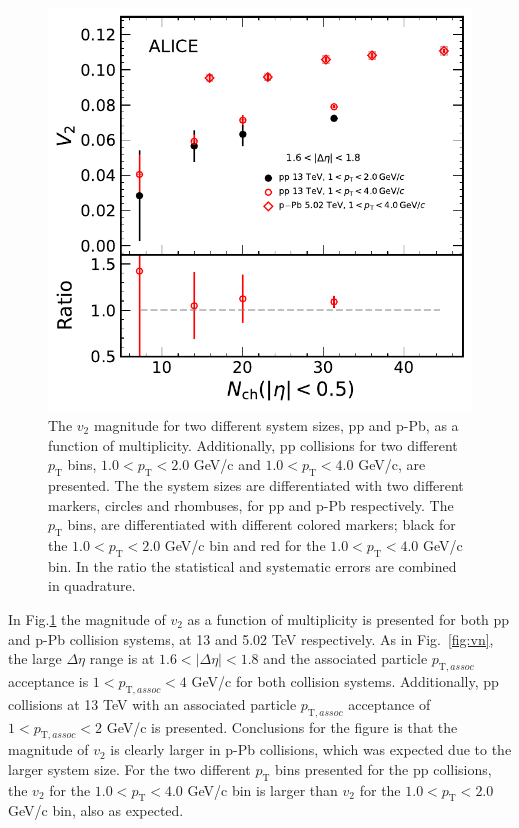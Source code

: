 \begin{figure}[!th]
	\centering
	\includegraphics[width=0.8 \textwidth]{figures/Fig6_v2Mult_allSystemsComp2.pdf} 
	\caption{The $v_2$ magnitude for two different system sizes, pp and p-Pb, as a function of multiplicity. Additionally, pp collisions for two different $p_\mathrm{T}$ bins, $1.0<p_\mathrm{T}<2.0$ GeV/c and $1.0<p_\mathrm{T}<4.0$ GeV/c, are presented. The the system sizes are differentiated with two different markers, circles and rhombuses, for pp and p-Pb respectively. The $p_\mathrm{T}$ bins, are differentiated with different colored markers; black for the $1.0<p_\mathrm{T}<2.0$ GeV/c bin and red for the $1.0<p_\mathrm{T}<4.0$ GeV/c bin. In the ratio the statistical and systematic errors are combined in quadrature.} 
	\label{fig:v2mult}
\end{figure}

In Fig.\ref{fig:v2mult} the magnitude of $v_2$ as a function of multiplicity is presented for both pp and p-Pb collision systems, at 13 and 5.02 TeV respectively. As in Fig.~\ref{fig:vn}, the large $\Delta\eta$ range is at $1.6<|\Delta\eta|<1.8$ and the associated particle $p_{\mathrm{T},assoc}$ acceptance is $1<p_{\mathrm{T},assoc}<4$ GeV/c for both collision systems. Additionally, pp collisions at 13 TeV with an associated particle $p_{\mathrm{T},assoc}$ acceptance of $1<p_{\mathrm{T},assoc}<2$ GeV/c is presented. Conclusions for the figure is that the magnitude of $v_2$ is clearly larger in p-Pb collisions, which was expected due to the larger system size. For the two different $p_\mathrm{T}$ bins presented for the pp collisions, the $v_2$ for the $1.0<p_\mathrm{T}<4.0$ GeV/c bin is larger than $v_2$ for the $1.0<p_\mathrm{T}<2.0$ GeV/c bin, also as expected.

